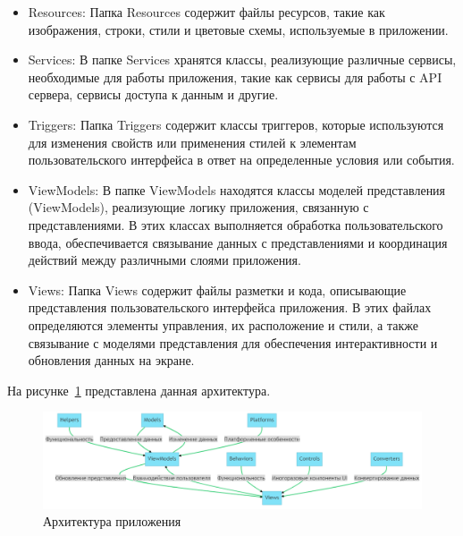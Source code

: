 \begin{itemize}
    \item Resources: Папка Resources содержит файлы ресурсов, такие как изображения, строки, стили и цветовые схемы, используемые в приложении.

    \item Services: В папке Services хранятся классы, реализующие различные сервисы, необходимые для работы приложения, такие как сервисы для работы с API сервера, сервисы доступа к данным и другие.

    \item Triggers: Папка Triggers содержит классы триггеров, которые используются для изменения свойств или применения стилей к элементам пользовательского интерфейса в ответ на определенные условия или события.

    \item ViewModels: В папке ViewModels находятся классы моделей представления (ViewModels), реализующие логику приложения, связанную с представлениями. В этих классах выполняется обработка пользовательского ввода, обеспечивается связывание данных с представлениями и координация действий между различными слоями приложения.

    \item Views: Папка Views содержит файлы разметки и кода, описывающие представления пользовательского интерфейса приложения. В этих файлах определяются элементы управления, их расположение и стили, а также связывание с моделями представления для обеспечения интерактивности и обновления данных на экране.
\end{itemize}

На рисунке~\ref{fig:fig02} представлена данная архитектура.
\begin{figure}
  \includegraphics[scale=0.5]{inc/architecture.png}
  \caption{Архитектура приложения}
  \label{fig:fig02}
\end{figure}

